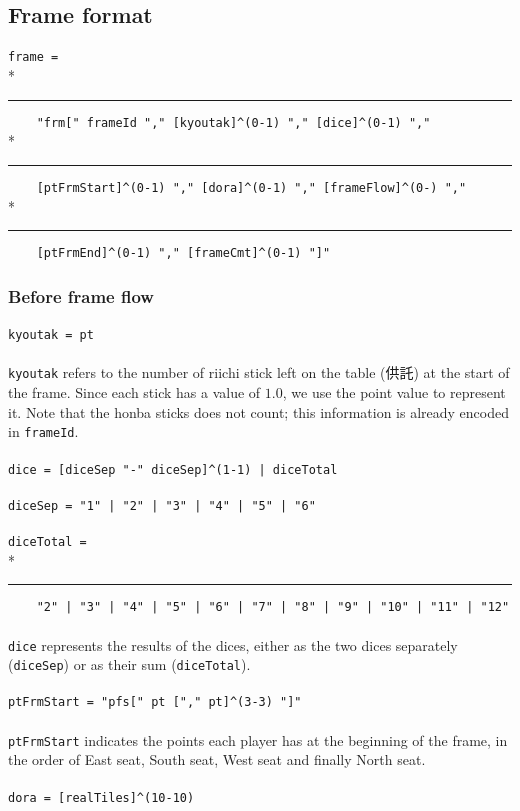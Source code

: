 \documentclass[%
	a4paper%
	,10pt%
	,twoside%
	,notitlepage%
]{article}%
\newcommand*{\ruleSymbol}{\textjapanese{⚠}}%
\newcommand*{\ruleMargin}{\marginpar{\flushright{}\ruleSymbol{}}}%
\newcommand*{\rulePar}{\paragraph*{\ruleMargin{}}}%
\newcommand*{\indentRule}{\rule{10pt}{0pt}}%
\begin{document}
	\subsection{Frame format}\label{subsec:frame}%
		\rulePar{}\lstinline/frame = /\\*{}%
		\indentRule{}\lstinline/    "frm[" frameId "," [kyoutak]^(0-1) "," [dice]^(0-1) "," /\\*{}%
		\indentRule{}\lstinline/    [ptFrmStart]^(0-1) "," [dora]^(0-1) "," [frameFlow]^(0-) "," /\\*{}%
		\indentRule{}\lstinline/    [ptFrmEnd]^(0-1) "," [frameCmt]^(0-1) "]"/%
		\subsubsection{Before frame flow}\label{subsubsec:prefrmflow}%
			\rulePar{}\lstinline/kyoutak = pt/%
			\paragraph*{}\lstinline/kyoutak/ refers to the number of riichi stick left on the table (\textjapanese{供託}) at the start of the frame. Since each stick has a value of $1.0$, we use the point value to represent it. Note that the honba sticks does not count; this information is already encoded in \lstinline/frameId/. %
			\rulePar{}\lstinline/dice = [diceSep "-" diceSep]^(1-1) | diceTotal/%
			\rulePar{}\lstinline/diceSep = "1" | "2" | "3" | "4" | "5" | "6"/%
			\rulePar{}\lstinline/diceTotal = /\\*{}%
			\indentRule{}\lstinline/    "2" | "3" | "4" | "5" | "6" | "7" | "8" | "9" | "10" | "11" | "12" /%
			\paragraph*{}\lstinline/dice/ represents the results of the dices, either as the two dices separately (\lstinline/diceSep/) or as their sum (\lstinline/diceTotal/). %
			\rulePar{}\lstinline/ptFrmStart = "pfs[" pt ["," pt]^(3-3) "]"/%
			\paragraph*{}\lstinline/ptFrmStart/ indicates the points each player has at the beginning of the frame, in the order of East seat, South seat, West seat and finally North seat. %
			\rulePar{}\lstinline/dora = [realTiles]^(10-10)/%
\end{document}
